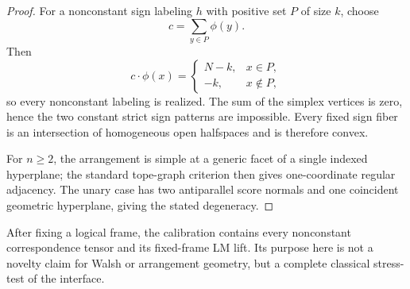 \documentclass[11pt]{article}
\theoremstyle{definition}
\theoremstyle{remark}
\begin{document}
\begin{proof}
For a nonconstant sign labeling $h$ with positive set $P$ of size $k$, choose
\[
 c=\sum_{y\in P}\phi(y).
\]
Then
\[
 c\cdot\phi(x)=
 \begin{cases}N-k,&x\in P,\\-k,&x\notin P,
 \end{cases}
\]
so every nonconstant labeling is realized. The sum of the simplex vertices is zero, hence the two constant strict sign patterns are impossible. Every fixed sign fiber is an intersection of homogeneous open halfspaces and is therefore convex.

For $n\ge2$, the arrangement is simple at a generic facet of a single indexed hyperplane; the standard tope-graph criterion then gives one-coordinate regular adjacency. The unary case has two antiparallel score normals and one coincident geometric hyperplane, giving the stated degeneracy.
\end{proof}

After fixing a logical frame, the calibration contains every nonconstant correspondence tensor and its fixed-frame LM lift. Its purpose here is not a novelty claim for Walsh or arrangement geometry, but a complete classical stress-test of the interface.
\end{document}
